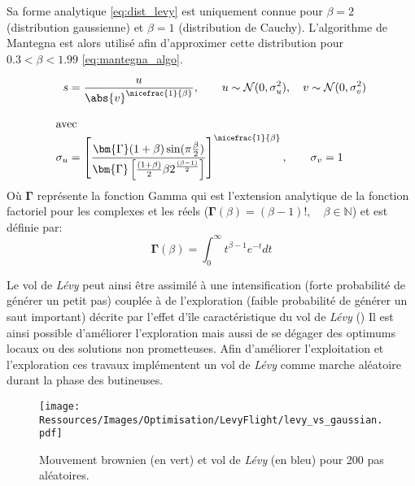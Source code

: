 Sa forme analytique \eqref{eq:dist_levy} est uniquement connue pour $\beta = 2$
(distribution gaussienne) et $\beta = 1$ (distribution de Cauchy).
L’algorithme de Mantegna \parencite{Mantegna19944677} est alors utilisé afin
d’approximer cette distribution pour $0.3 < \beta < 1.99$ \eqref{eq:mantegna_algo}.

\begin{align}\label{eq:mantegna_algo}
    s &= \frac{u}{\abs{v}^{\nicefrac{1}{\beta}}}, \qquad u \sim \mathcal{N}(0, \sigma_{u}^{2}),
        \quad v \sim \mathcal{N}(0, \sigma_{v}^{2}) \\[1em]
    \shortintertext{avec}
    \sigma_{u} &= \left[ \frac{\bm{{\Gamma}}(1+\beta)\sin(\pi\frac{\beta}{2})}%
                             {\bm{{\Gamma}} \left[\frac{(1+\beta)}{2}\beta
                              2^{\frac{(\beta-1)}{2}}\right]}\right]^{\nicefrac{1}{\beta}},%
    \qquad \sigma_{v} = 1 \notag
\end{align}
Où $\bm{{\Gamma}}$ représente la fonction Gamma qui est l’extension analytique de la
fonction factoriel pour les complexes et les réels ($\bm{{\Gamma}}(\beta) = (\beta -1)!,\quad \beta\in \mathbb{N}$)
et est définie par:
\begin{equation*}
  \bm{{\Gamma}}(\beta) = \int_{0}^{\infty} t^{\beta-1}e^{-t} dt
\end{equation*}

Le vol de \textit{Lévy} peut ainsi être assimilé à une intensification (forte probabilité de générer un petit pas)
couplée à de l’exploration (faible probabilité de générer un saut important) décrite par
l’effet d’île caractéristique du vol de \textit{Lévy} ()
Il est ainsi possible d’améliorer l’exploration mais aussi de se dégager des optimums
locaux ou des solutions non prometteuses. Afin d’améliorer l’exploitation et l’exploration
ces travaux implémentent un vol de \textit{Lévy} comme marche aléatoire durant la phase des butineuses.

\begin{figure}
    \centering
    \texttt{[image: Ressources/Images/Optimisation/LevyFlight/levy\_vs\_gaussian.pdf]}
    \caption{Mouvement brownien (en vert) et vol de \textit{Lévy} (en bleu) pour 200 pas aléatoires.}
    \label{fig:levy_vs_gaussian}
\end{figure}


